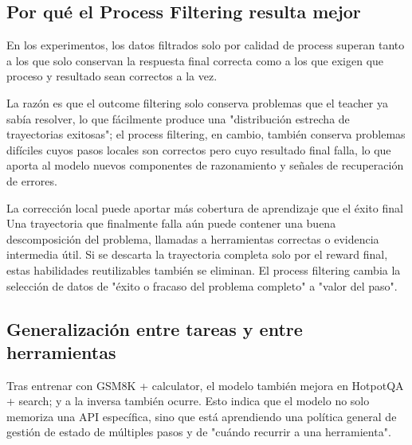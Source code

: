 \subsection{Por qué el Process Filtering resulta mejor}

En los experimentos, los datos filtrados solo por calidad de process superan tanto a los que solo conservan la respuesta final correcta como a los que exigen que proceso y resultado sean correctos a la vez.


La razón es que el outcome filtering solo conserva problemas que el teacher ya sabía resolver, lo que fácilmente produce una "distribución estrecha de trayectorias exitosas"; el process filtering, en cambio, también conserva problemas difíciles cuyos pasos locales son correctos pero cuyo resultado final falla, lo que aporta al modelo nuevos componentes de razonamiento y señales de recuperación de errores.

\begin{importantbox}{La corrección local puede aportar más cobertura de aprendizaje que el éxito final}
Una trayectoria que finalmente falla aún puede contener una buena descomposición del problema, llamadas a herramientas correctas o evidencia intermedia útil. Si se descarta la trayectoria completa solo por el reward final, estas habilidades reutilizables también se eliminan. El process filtering cambia la selección de datos de "éxito o fracaso del problema completo" a "valor del paso".
\end{importantbox}

\subsection{Generalización entre tareas y entre herramientas}

Tras entrenar con GSM8K + calculator, el modelo también mejora en HotpotQA + search; y a la inversa también ocurre. Esto indica que el modelo no solo memoriza una API específica, sino que está aprendiendo una política general de gestión de estado de múltiples pasos y de "cuándo recurrir a una herramienta".


